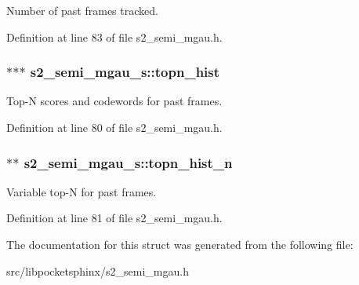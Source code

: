 \-Number of past frames tracked. 



\-Definition at line 83 of file s2\-\_\-semi\-\_\-mgau.\-h.

\subsubsection[{topn\-\_\-hist}]{$\ast$$\ast$$\ast$ {\bf s2\-\_\-semi\-\_\-mgau\-\_\-s\-::topn\-\_\-hist}}\label{structs2__semi__mgau__s_a8892e22acbf81b08972cb6d7968ed4ce}


\-Top-\/\-N scores and codewords for past frames. 



\-Definition at line 80 of file s2\-\_\-semi\-\_\-mgau.\-h.

\subsubsection[{topn\-\_\-hist\-\_\-n}]{$\ast$$\ast$ {\bf s2\-\_\-semi\-\_\-mgau\-\_\-s\-::topn\-\_\-hist\-\_\-n}}\label{structs2__semi__mgau__s_acfe1e5d43a25418ef19afba837f85cf7}


\-Variable top-\/\-N for past frames. 



\-Definition at line 81 of file s2\-\_\-semi\-\_\-mgau.\-h.



\-The documentation for this struct was generated from the following file\-:\begin{DoxyCompactItemize}
\item 
src/libpocketsphinx/s2\-\_\-semi\-\_\-mgau.\-h\end{DoxyCompactItemize}
